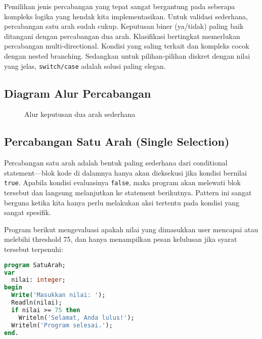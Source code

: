\documentclass[../main.tex]{subfiles}
\begin{document}
Pemilihan jenis percabangan yang tepat sangat bergantung pada seberapa kompleks logika yang hendak kita implementasikan. Untuk validasi sederhana, percabangan satu arah sudah cukup. Keputusan biner (ya/tidak) paling baik ditangani dengan percabangan dua arah. Klasifikasi bertingkat memerlukan percabangan multi-directional. Kondisi yang saling terkait dan kompleks cocok dengan nested branching. Sedangkan untuk pilihan-pilihan diskret dengan nilai yang jelas, \texttt{switch/case} adalah solusi paling elegan.

\subsection{Diagram Alur Percabangan}
\begin{figure}[H]
  \centering
  \caption{Alur keputusan dua arah sederhana}
\end{figure}

\subsection{Percabangan Satu Arah (Single Selection)}
Percabangan satu arah adalah bentuk paling sederhana dari conditional statement—blok kode di dalamnya hanya akan dieksekusi jika kondisi bernilai \texttt{true}. Apabila kondisi evaluasinya \texttt{false}, maka program akan melewati blok tersebut dan langsung melanjutkan ke statement berikutnya. Pattern ini sangat berguna ketika kita hanya perlu melakukan aksi tertentu pada kondisi yang sangat spesifik.

Program berikut mengevaluasi apakah nilai yang dimasukkan user mencapai atau melebihi threshold 75, dan hanya menampilkan pesan kelulusan jika syarat tersebut terpenuhi:

\begin{lstlisting}[language=Pascal, caption={Percabangan satu arah di Pascal}]
program SatuArah;
var
  nilai: integer;
begin
  Write('Masukkan nilai: ');
  Readln(nilai);
  if nilai >= 75 then
    Writeln('Selamat, Anda lulus!');
  Writeln('Program selesai.');
end.
\end{lstlisting}
\end{document}
